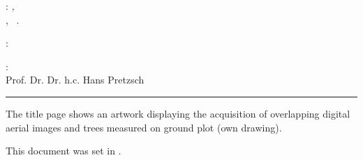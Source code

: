 \thispagestyle{empty}

\hfill

\vfill

\noindent\myName:
\textit{\myTitle,} \\
\mySubTitle, \textcopyright\ \myTime.


\medskip
{}: \\

\medskip
{}: \\
Prof. Dr. Dr. h.c. Hans Pretzsch

\vspace{1cm}
\hrule
\bigskip

\noindent The title page shows an artwork displaying the acquisition of overlapping digital aerial images and trees measured on ground plot (own drawing).

\noindent This document was set in \LaTex{}.

